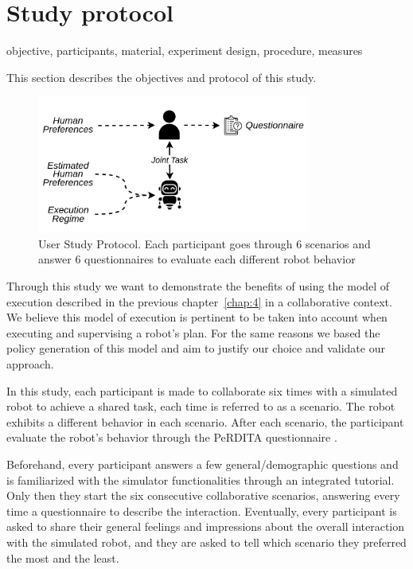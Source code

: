 \section{Study protocol}

objective, participants, material, experiment design, procedure, measures

This section describes the objectives and protocol of this study.  

\begin{figure}
    \centering
    \includegraphics[width=0.8\textwidth]{images/Chapter5/UserStudyProcedure.png}
    \caption{User Study Protocol. Each participant goes through 6 scenarios and answer 6 questionnaires to evaluate each different robot behavior}
    \label{fig:user_study_protocol}
\end{figure}




Through this study we want to demonstrate the benefits of using the model of execution described in the previous chapter~\ref{chap:4} in a collaborative context. We believe this model of execution is pertinent to be taken into account when executing and supervising a robot's plan. For the same reasons we based the policy generation of this model and aim to justify our choice and validate our approach.

In this study, each participant is made to collaborate six times with a simulated robot to achieve a shared task, each time is referred to as a scenario. The robot exhibits a different behavior in each scenario. After each scenario, the participant evaluate the robot's behavior through the PeRDITA questionnaire \cite{devin_evaluating_2018}.

Beforehand, every participant answers a few general/demographic questions and is familiarized with the simulator functionalities through an integrated tutorial. Only then they start the six consecutive collaborative scenarios, answering every time a questionnaire to describe the interaction. Eventually, every participant is asked to share their general feelings and impressions about the overall interaction with the simulated robot, and they are asked to tell which scenario they preferred the most and the least.

